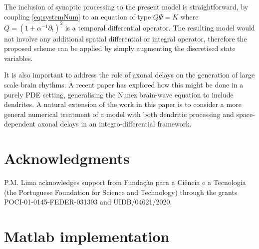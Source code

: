 \documentclass[a4paper,final]{siamart190516}
\begin{document}
The inclusion of synaptic processing to the present model is straightforward, by
coupling \eqref{eq:systemNum} to an equation of type $Q\Psi =K$ where $Q=
(1+\alpha^{-1} \partial_t)^2$ is a temporal differential operator. The resulting
model would not involve any additional spatial differential or integral
operator, therefore the proposed scheme can be applied by simply augmenting the
discretised state variables.
%

It is also important to address the role of axonal delays on the generation of large
scale brain rhythms.  A recent paper \cite{Ross2019} has explored how this might be
done in a purely PDE setting, generalising the Nunez brain-wave equation to include
dendrites. A natural extension of the work in this paper is to consider a more
general numerical treatment of a model with both dendritic processing and
space-dependent axonal delays in an integro-differential framework.

\section*{Acknowledgments} P.M. Lima acknowledges support from Funda\c c\~ao para a
Ci\^encia e a Tecnologia (the Portuguese Foundation for Science and Technology)
through the  grants POCI-01-0145-FEDER-031393 and UIDB/04621/2020.


\newpage
\appendix
\section{Matlab implementation}\label{sec:matlab}
\phantom{In this section we provide a listing of the code used}




\end{document}
